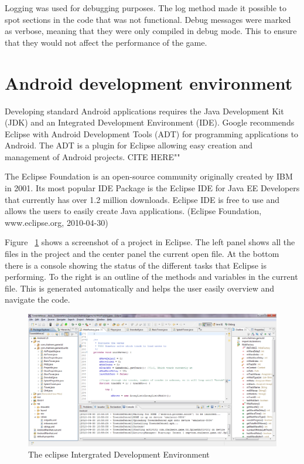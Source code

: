 Logging was used for debugging purposes. The log method made it possible to spot sections in the code that was not functional. Debug messages were marked as verbose, meaning that they were only compiled in debug mode. This to ensure that they would not affect the performance of the game.
\section{Android development environment}

Developing standard Android applications requires the Java Development Kit (JDK) and an Integrated Development Environment (IDE). Google recommends Eclipse with Android Development Tools (ADT) for programming applications to Android. The ADT is a plugin for Eclipse allowing easy creation and management of Android projects. CITE HERE""

The Eclipse Foundation is an open-source community originally created by IBM in 2001. Its most popular IDE Package is the Eclipse IDE for Java EE Developers that currently has over 1.2 million downloads. Eclipse IDE is free to use and allows the users to easily create Java applications. (Eclipse Foundation, www.eclipse.org, 2010-04-30)

Figure ~\ref{fig:eclipseIDE} shows a screenshot of a project in Eclipse. The left panel shows all the files in the project and the center panel the current open file. At the bottom there is a console showing the status of the different tasks that Eclipse is performing. To the right is an outline of the methods and variables in the current file. This is generated automatically and helps the user easily overview and navigate the code.

\begin{figure}[here]
\begin{center}
\includegraphics[scale=0.3]{pics/chapters/chapter2/eclipse}
\end{center}
\caption{The eclipse Intergrated Development Environment}
\label{fig:eclipseIDE}
\end{figure}

